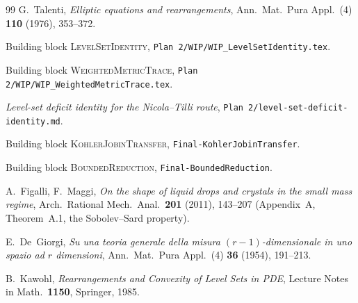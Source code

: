 \begin{thebibliography}{99}
G.~Talenti, \emph{Elliptic equations and rearrangements}, Ann.\ Mat.\
Pura Appl.\ (4) \textbf{110} (1976), 353--372.


Building block \textsc{LevelSetIdentity},
\texttt{Plan 2/WIP/WIP\_LevelSetIdentity.tex}.

Building block \textsc{WeightedMetricTrace},
\texttt{Plan 2/WIP/WIP\_WeightedMetricTrace.tex}.

\emph{Level-set deficit identity for the Nicola--Tilli route},
\texttt{Plan 2/level-set-deficit-identity.md}.

Building block \textsc{KohlerJobinTransfer},
\texttt{Final-KohlerJobinTransfer}.

Building block \textsc{BoundedReduction},
\texttt{Final-BoundedReduction}.

A.~Figalli, F.~Maggi,
\emph{On the shape of liquid drops and crystals in the small mass
regime}, Arch.\ Rational Mech.\ Anal.\ \textbf{201} (2011),
143--207 (Appendix~A, Theorem~A.1, the Sobolev--Sard property).

E.~De~Giorgi, \emph{Su una teoria generale della misura
$(r-1)$-dimensionale in uno spazio ad $r$ dimensioni}, Ann.\ Mat.\
Pura Appl.\ (4) \textbf{36} (1954), 191--213.

B.~Kawohl, \emph{Rearrangements and Convexity of Level Sets in
PDE}, Lecture Notes in Math.\ \textbf{1150}, Springer, 1985.

\end{thebibliography}
\fi
